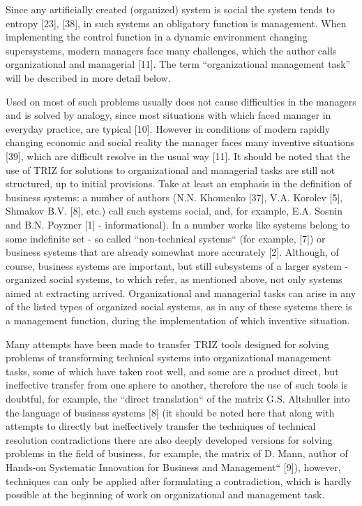 \documentclass[11pt,a4paper]{book}
\begin{document}
Since any artificially created (organized) system is social the system tends
to entropy [23], [38], in such systems an obligatory function is management.
When implementing the control function in a dynamic environment changing
supersystems, modern managers face many challenges, which the author calls
organizational and managerial [11]. The term “organizational management task”
will be described in more detail below.

Used on most of such problems usually does not cause difficulties in the
managers and is solved by analogy, since most situations with which faced
manager in everyday practice, are typical [10]. However in conditions of
modern rapidly changing economic and social reality the manager faces many
inventive situations [39], which are difficult resolve in the usual way [11].
It should be noted that the use of TRIZ for solutions to organizational and
managerial tasks are still not structured, up to initial provisions. Take at
least an emphasis in the definition of business systems: a number of authors
(N.N. Khomenko [37], V.A. Korolev [5], Shmakov B.V. [8], etc.) call such
systems social, and, for example, E.A. Sosnin and B.N. Poyzner [1] -
informational).  In a number works like systems belong to some indefinite set
- so called “non-technical systems“ (for example, [7]) or business systems
that are already somewhat more accurately [2]. Although, of course, business
systems are important, but still subsystems of a larger system - organized
social systems, to which refer, as mentioned above, not only systems aimed at
extracting arrived. Organizational and managerial tasks can arise in any of
the listed types of organized social systems, as in any of these systems there
is a management function, during the implementation of which inventive
situation.

Many attempts have been made to transfer TRIZ tools designed for solving
problems of transforming technical systems into organizational management
tasks, some of which have taken root well, and some are a product direct, but
ineffective transfer from one sphere to another, therefore the use of such
tools is doubtful, for example, the “direct translation“ of the matrix
G.S. Altshuller into the language of business systems [8] (it should be noted
here that along with attempts to directly but ineffectively transfer the
techniques of technical resolution contradictions there are also deeply
developed versions for solving problems in the field of business, for example,
the matrix of D. Mann, author of Hands-on Systematic Innovation for Business
and Management“ [9]), however, techniques can only be applied after
formulating a contradiction, which is hardly possible at the beginning of work
on organizational and management task.
\end{document}
